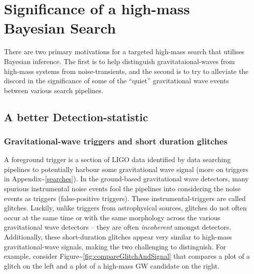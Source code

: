 \documentclass[%
 reprint,
 amsmath,amssymb,
 aps,
]{revtex4}
\begin{document}
\section{Significance of a high-mass Bayesian Search}\label{significance}

There are two primary motivations for a targeted high-mass search that utilises Bayesian inference. The first is to help
distinguish gravitataional-waves from high-mass systems from noise-transients, and the second is to try to alleviate the
discord in the significance of some of the ``quiet'' gravitational wave events between various search pipelines.

\hypertarget{a-better-detection-statistic}{%
\subsection{A better Detection-statistic}\label{a-better-detection-statistic}}

\hypertarget{gravitational-wave-triggers-and-short-duration-glitches}{%
\subsubsection{Gravitational-wave triggers and short duration glitches}\label{gravitational-wave-triggers-and-short-duration-glitches}}

A foreground trigger is a section of LIGO data identified by data searching pipelines to potentially harbour some
gravitational wave signal (more on triggers in Appendix\textasciitilde\ref{searches}). In the ground-based gravitational wave
detectors, many spurious instrumental noise events fool the pipelines into considering the noise events as triggers
(false-positive triggers). These instrumental-triggers are called glitches. Luckily, unlike triggers from astrophysical
sources, glitches do not often occur at the same time or with the same morphology across the various gravitational wave
detectors -- they are often \emph{incoherent} amongst detectors. Additionally, these short-duration glitches appear very
similar to high-mass gravitational-wave signals, making the two challenging to distinguish. For example, consider
Figure\textasciitilde\ref{fig:compareGlitchAndSignal} that compares a plot of a glitch on the left and a plot of a high-mass GW
candidate on the right.
\end{document}
